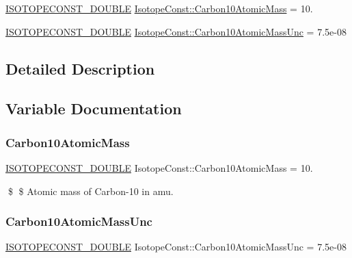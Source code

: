 \begin{DoxyCompactItemize}
\item 
\mbox{\hyperlink{group___isotope_const-_macros_ga8f45a7272ce02c0b4c65c44636ed719a}{I\+S\+O\+T\+O\+P\+E\+C\+O\+N\+S\+T\+\_\+\+D\+O\+U\+B\+LE}} \mbox{\hyperlink{group___isotope_const-_carbon-_c10_ga56f1d5590df3ad817bc8ffdf4d3d3e52}{Isotope\+Const\+::\+Carbon10\+Atomic\+Mass}} = 10.
\item 
\mbox{\hyperlink{group___isotope_const-_macros_ga8f45a7272ce02c0b4c65c44636ed719a}{I\+S\+O\+T\+O\+P\+E\+C\+O\+N\+S\+T\+\_\+\+D\+O\+U\+B\+LE}} \mbox{\hyperlink{group___isotope_const-_carbon-_c10_ga3d5d85e77076a41d940b9c7fe0580053}{Isotope\+Const\+::\+Carbon10\+Atomic\+Mass\+Unc}} = 7.\+5e-\/08
\end{DoxyCompactItemize}


\subsection{Detailed Description}


\subsection{Variable Documentation}
\mbox{\label{group___isotope_const-_carbon-_c10_ga56f1d5590df3ad817bc8ffdf4d3d3e52}} 
\subsubsection{\texorpdfstring{Carbon10\+Atomic\+Mass}{Carbon10AtomicMass}}
{\footnotesize\ttfamily \mbox{\hyperlink{group___isotope_const-_macros_ga8f45a7272ce02c0b4c65c44636ed719a}{I\+S\+O\+T\+O\+P\+E\+C\+O\+N\+S\+T\+\_\+\+D\+O\+U\+B\+LE}} Isotope\+Const\+::\+Carbon10\+Atomic\+Mass = 10.}

\$ \$ Atomic mass of Carbon-\/10 in amu. \mbox{\label{group___isotope_const-_carbon-_c10_ga3d5d85e77076a41d940b9c7fe0580053}} 
\subsubsection{\texorpdfstring{Carbon10\+Atomic\+Mass\+Unc}{Carbon10AtomicMassUnc}}
{\footnotesize\ttfamily \mbox{\hyperlink{group___isotope_const-_macros_ga8f45a7272ce02c0b4c65c44636ed719a}{I\+S\+O\+T\+O\+P\+E\+C\+O\+N\+S\+T\+\_\+\+D\+O\+U\+B\+LE}} Isotope\+Const\+::\+Carbon10\+Atomic\+Mass\+Unc = 7.\+5e-\/08}


